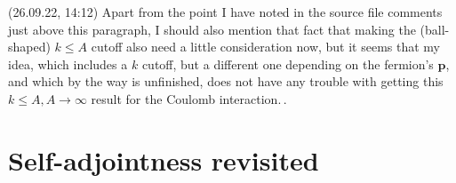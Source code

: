 \documentclass{report}
\begin{document}

(26.09.22, 14:12) Apart from the point I have noted in the source file comments just above this paragraph, I should also mention that fact that making the (ball-shaped) $k \leq A$ cutoff also need a little consideration now, but it seems that my idea, which includes a $k$ cutoff, but a different one depending on the fermion's $\mathbf{p}$, and which by the way is unfinished, does not have any trouble with getting this $k \leq A, A \to \infty$ result for the Coulomb interaction.\,. %






\chapter{Self-adjointness revisited}
\end{document}

